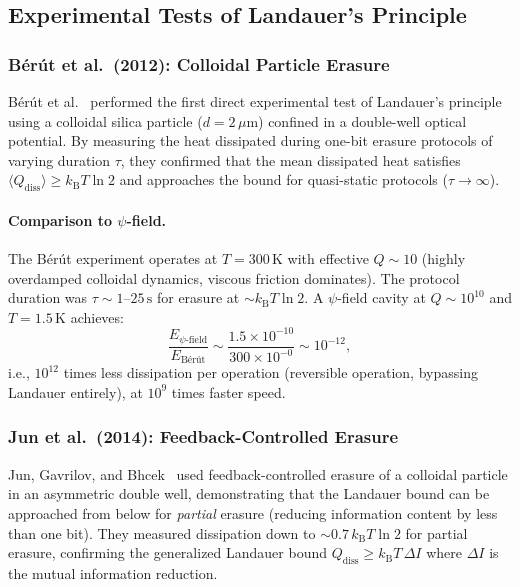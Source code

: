 \documentclass[11pt,twocolumn]{article}
\theoremstyle{definition}
\theoremstyle{remark}
\newcommand{\kB}{k_{\mathrm{B}}}
\begin{document}
\subsection{Experimental Tests of Landauer's Principle}

\subsubsection{B\'er\'ut et al.\ (2012): Colloidal Particle Erasure}

B\'er\'ut et al.~\cite{Berut2012} performed the first direct
experimental test of Landauer's principle using a colloidal silica
particle ($d = 2\,\mu\mathrm{m}$) confined in a double-well optical
potential. By measuring the heat dissipated during one-bit erasure
protocols of varying duration $\tau$, they confirmed that the mean
dissipated heat satisfies $\langle Q_{\mathrm{diss}}\rangle \geq \kB T
\ln 2$ and approaches the bound for quasi-static protocols ($\tau \to
\infty$).

\paragraph{Comparison to $\psi$-field.}
The B\'er\'ut experiment operates at $T = 300\,\mathrm{K}$ with
effective $Q \sim 10$ (highly overdamped colloidal dynamics, viscous
friction dominates). The protocol duration was $\tau \sim 1$--$25\,\mathrm{s}$
for erasure at $\sim \kB T\ln 2$. A $\psi$-field cavity at $Q \sim
10^{10}$ and $T = 1.5\,\mathrm{K}$ achieves:
\begin{equation}
\frac{E_{\psi\text{-field}}}{E_{\text{B\'er\'ut}}} \sim \frac{1.5 \times 10^{-10}}{300 \times 10^{-0}} \sim 10^{-12},
\end{equation}
i.e., $10^{12}$ times less dissipation per operation (reversible
operation, bypassing Landauer entirely), at $10^9$ times faster speed.

\subsubsection{Jun et al.\ (2014): Feedback-Controlled Erasure}

Jun, Gavrilov, and Bhcek~\cite{Jun2014} used feedback-controlled
erasure of a colloidal particle in an asymmetric double well,
demonstrating that the Landauer bound can be approached from below for
\emph{partial} erasure (reducing information content by less than one
bit). They measured dissipation down to $\sim 0.7\,\kB T\ln 2$ for
partial erasure, confirming the generalized Landauer bound
$Q_{\mathrm{diss}} \geq \kB T\,\Delta I$ where $\Delta I$ is the mutual
information reduction.
\end{document}
